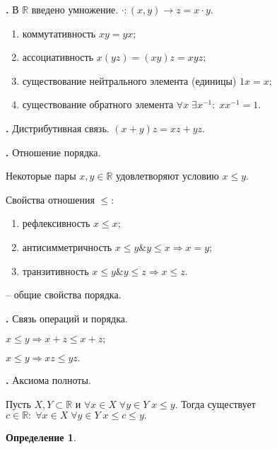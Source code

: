 \documentclass{article}
\newcommand{\RomanNumeralCaps}[1]
    {\MakeUppercase{\romannumeral #1}}
\newtheorem{Definition}{Определение}[section]
\begin{document}
{\bf \RomanNumeralCaps{2}.} В $\mathbb{R}$ введено умножение. $\cdot:(x,y)\rightarrow z=x\cdot y.$
\begin{enumerate}
\item коммутативность \quad $xy=yx;$
\item ассоциативность \quad $x(yz)=(xy)z=xyz;$
\item существование нейтрального элемента (единицы) \quad $1x=x;$
\item существование обратного элемента \quad $\forall x \; \exists x^{-1}: \; xx^{-1}=1.$
\end{enumerate}

{\bf \RomanNumeralCaps{3}.} Дистрибутивная связь. $(x+y)z=xz+yz.$

{\bf \RomanNumeralCaps{4}.} Отношение порядка. 

Некоторые пары $x,y\in\mathbb{R}$ удовлетворяют условию $x\leq y.$

Свойства отношения $\leq:$
\begin{enumerate}
\item рефлексивность \quad $x\leq x;$
\item антисимметричность \quad $x\leq y \& y\leq x \Rightarrow x=y;$
\item транзитивность \quad $x\leq y \& y\leq z \Rightarrow x\leq z.$
\end{enumerate}
-- общие свойства порядка.

{\bf \RomanNumeralCaps{5}.} Связь операций и порядка.

$x\leq y \Rightarrow x+z\leq x+z;$

$x\leq y \Rightarrow xz\leq yz.$

{\bf \RomanNumeralCaps{6}.} Аксиома полноты.

Пусть $X, Y\subset \mathbb{R}$ и $\forall x\in X \; \forall y\in Y \; x\leq y.$ Тогда существует $c\in\mathbb{R}: \; \forall x\in X \; \forall y\in Y \; x\leq c\leq y.$

\begin{Definition}

\end{Definition}
\end{document}
